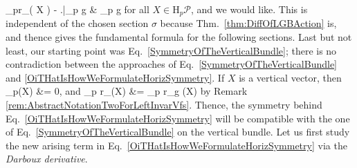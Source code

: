 \documentclass[a4paper,oneside,11pt,bibliography=totoc]{scrartcl}
\makeatletter
\def\oversortoftilde#1{\mathop{\vbox{\m@th\ialign{##\crcr\noalign{\kern3\p@}%
      \sortoftildefill\crcr\noalign{\kern3\p@\nointerlineskip}%
      $\hfil\displaystyle{#1}\hfil$\crcr}}}\limits}
\def\sortoftildefill{$\m@th \setbox\z@\hbox{$\braceld$}%
  \braceld\leaders\vrule \@height\ht\z@ \@depth\z@\hfill\braceru$}
\def\bas#1\eas{\begin{align*}#1\end{align*}}
\theoremstyle{plain}
\theoremstyle{remark}
\theoremstyle{definition}
\makeatother
\begin{document}
_pr_\sigma\mleft( 
	X 
\mright)
	- \mleft.{\oversortoftilde{
		\mleft( \mu_{\mathcal{G}}^{\mathrm{tot}}\mright)_g \bigl(
		\mathrm{D}_p (\sigma \circ \pi)(X)
	\bigr)
	}}\mright|_{p \cdot g}
&\in
{}_{p \cdot g}
\ea
for all $X \in \mathrm{H}_p\mathcal{P}$, and we would like. This is independent of the chosen section $\sigma$ because Thm.\ \ref{thm:DiffOfLGBAction} is, and thence gives the fundamental formula for the following sections. Last but not least, our starting point was Eq.\ \eqref{SymmetryOfTheVerticalBundle}; there is no contradiction between the approaches of Eq.\ \eqref{SymmetryOfTheVerticalBundle} and \eqref{OiTHatIsHowWeFormulateHorizSymmetry}. If $X$ is a vertical vector, then
\bas
\mathrm{D}_p\pi(X) &= 0,
\eas
and
\bas
\mathrm{D}_p r_\sigma (X)
&=
_p r_g (X)
\eas
by Remark \ref{rem:AbstractNotationTwoForLeftInvarVfs}. Thence, the symmetry behind Eq.\ \eqref{OiTHatIsHowWeFormulateHorizSymmetry} will be compatible with the one of Eq.\ \eqref{SymmetryOfTheVerticalBundle} on the vertical bundle. Let us first study the new arising term in Eq.\ \eqref{OiTHatIsHowWeFormulateHorizSymmetry} via the \textit{Darboux derivative}.
\end{document}
